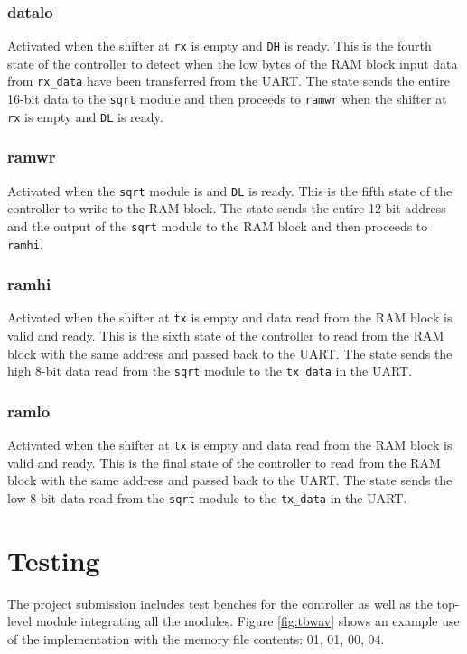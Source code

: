\documentclass[paper=usletter, fontsize=12pt]{article}
\begin{document}
            \subsubsection{datalo} Activated when the shifter at \texttt{rx} is
            empty and \texttt{DH} is ready. This is the fourth state of the
            controller to detect when the low bytes of the RAM block input data
            from \texttt{rx\_data} have been transferred from the UART. The
            state sends the entire 16-bit data to the \texttt{sqrt} module and
            then proceeds to \texttt{ramwr} when the shifter at \texttt{rx} is
            empty and \texttt{DL} is ready.

            \subsubsection{ramwr} Activated when the \texttt{sqrt} module is
            and \texttt{DL} is ready. This is the fifth state of the controller
            to write to the RAM block. The state sends the entire 12-bit
            address and the output of the \texttt{sqrt} module to the RAM block
            and then proceeds to \texttt{ramhi}.

            \subsubsection{ramhi} Activated when the shifter at \texttt{tx} is
            empty and data read from the RAM block is valid and ready. This is
            the sixth state of the controller to read from the RAM block with
            the same address and passed back to the UART. The state sends the
            high 8-bit data read from the \texttt{sqrt} module to the
            \texttt{tx\_data} in the UART.

            \subsubsection{ramlo} Activated when the shifter at \texttt{tx} is
            empty and data read from the RAM block is valid and ready. This is
            the final state of the controller to read from the RAM block with
            the same address and passed back to the UART. The state sends the
            low 8-bit data read from the \texttt{sqrt} module to the
            \texttt{tx\_data} in the UART.

    \newpage
    \section{Testing} The project submission includes test benches for the
    controller as well as the top-level module integrating all the modules.
    Figure \ref{fig:tbwav} shows an example use of the implementation with the
    memory file contents: 01, 01, 00, 04.
\end{document}
